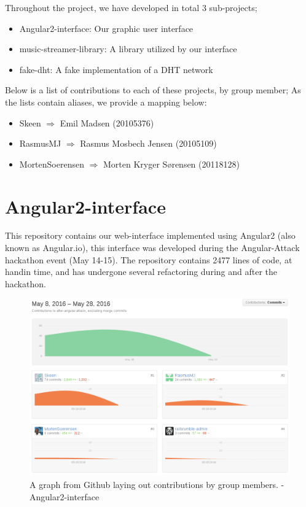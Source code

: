Throughout the project, we have developed in total 3 sub-projects;
\begin{itemize}
\item Angular2-interface: Our graphic user interface
\item music-streamer-library: A library utilized by our interface
\item fake-dht: A fake implementation of a \acs{DHT} network
\end{itemize}
Below is a list of contributions to each of these projects, by group member;
As the lists contain aliases, we provide a mapping below:
\begin{itemize}
    \item Skeen $\Rightarrow$ Emil Madsen (20105376)
    \item RasmusMJ $\Rightarrow$ Rasmus Mosbech Jensen (20105109)
    \item MortenSoerensen $\Rightarrow$ Morten Kryger Sørensen (20118128)
\end{itemize}

\section{Angular2-interface}
This repository contains our web-interface implemented using Angular2 (also 
known as Angular.io), this interface was developed during the Angular-Attack
hackathon event (May 14-15).
\newline\newline
The repository contains 2477 lines of code, at handin time, and has undergone 
several refactoring during and after the hackathon.

\begin{figure}[H]
  \centering
    \includegraphics[width=\linewidth]{gfx/Angular-interface}
  \caption{A graph from Github laying out contributions by group members. - Angular2-interface}
  \label{fig:angular-interface}
\end{figure}

